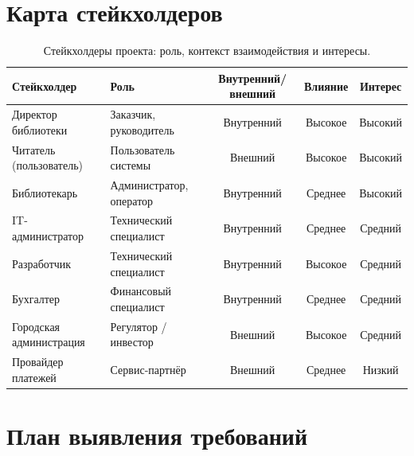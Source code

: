 \documentclass[12pt]{report}
\begin{document}
	\section*{Карта стейкхолдеров}
	
	\begin{table}[h]
		\hspace{-1.5cm}
		\begin{tabular}{|l|l|c|c|c|}
			\hline
			\textbf{Стейкхолдер} & \textbf{Роль} & \textbf{Внутренний/внешний} & \textbf{Влияние} & \textbf{Интерес} \\
			\hline
			Директор библиотеки & Заказчик, руководитель & Внутренний & Высокое & Высокий \\
			\hline
			Читатель (пользователь) & Пользователь системы & Внешний & Высокое & Высокий \\
			\hline
			Библиотекарь & Администратор, оператор & Внутренний & Среднее & Высокий \\
			\hline
			IT-администратор & Технический специалист & Внутренний & Среднее & Средний \\
			\hline
			Разработчик & Технический специалист & Внутренний & Высокое & Средний  \\
			\hline
			Бухгалтер & Финансовый специалист & Внутренний & Среднее & Средний  \\
			\hline
			Городская администрация & Регулятор / инвестор & Внешний & Высокое & Средний \\
			\hline
			Провайдер платежей & Сервис-партнёр & Внешний & Среднее & Низкий \\
			\hline
		\end{tabular}
		\caption{Стейкхолдеры проекта: роль, контекст взаимодействия и интересы.}
		\label{tab:stakeholders}
	\end{table}
	
	\section*{План выявления требований}
	
\end{document}
